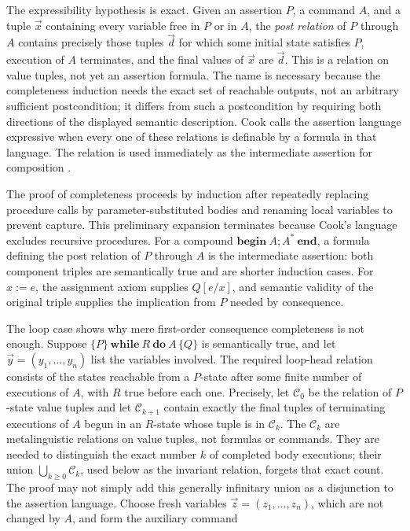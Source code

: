 The expressibility hypothesis is exact.  Given an assertion \(P\), a command
\(A\), and a tuple \(\vec x\) containing every variable free in \(P\) or in
\(A\), the \emph{post relation} of \(P\) through \(A\) contains precisely those
tuples \(\vec d\) for which some initial state satisfies \(P\), execution of
\(A\) terminates, and the final values of \(\vec x\) are \(\vec d\).  This is a
relation on value tuples, not yet an assertion formula.  The name is necessary
because the completeness induction needs the exact set of reachable outputs,
not an arbitrary sufficient postcondition; it differs from such a
postcondition by requiring both directions of the displayed semantic
description.  Cook calls the assertion language expressive when every one of
these relations is definable by a formula in that language.  The relation is
used immediately as the intermediate assertion for composition
\cite[pp.~85--86]{Cook1978}.

The proof of completeness proceeds by induction after repeatedly replacing
procedure calls by parameter-substituted bodies and renaming local variables
to prevent capture.  This preliminary expansion terminates because Cook's
language excludes recursive procedures.  For a compound
\(\mathbf{begin}\ A;A^*\ \mathbf{end}\), a formula defining the post relation
of \(P\) through \(A\) is the intermediate assertion: both component triples
are semantically true and are shorter induction cases.  For \(x:=e\), the
assignment axiom supplies \(Q[e/x]\), and semantic validity of the original
triple supplies the implication from \(P\) needed by consequence.

The loop case shows why mere first-order consequence completeness is not
enough.  Suppose
\(\{P\}\,\mathbf{while}\ R\ \mathbf{do}\ A\,\{Q\}\) is semantically true, and
let \(\vec y=(y_1,\ldots,y_n)\) list the variables involved.  The required
loop-head relation consists of the states reachable from a \(P\)-state after
some finite number of executions of \(A\), with \(R\) true before each one.
Precisely, let \(\mathcal C_0\) be the relation of \(P\)-state value tuples and
let \(\mathcal C_{k+1}\) contain exactly the final tuples of terminating
executions of \(A\) begun in an \(R\)-state whose tuple is in
\(\mathcal C_k\).  The \(\mathcal C_k\) are metalinguistic relations on value
tuples, not formulas or commands.  They are needed to distinguish the exact
number \(k\) of completed body executions; their union
\(\bigcup_{k\geq0}\mathcal C_k\), used below as the invariant relation, forgets
that exact count.  The proof may not simply add this generally infinitary
union as a disjunction to the assertion language.
Choose fresh variables \(\vec z=(z_1,\ldots,z_n)\), which are not changed by
\(A\), and form the auxiliary command

